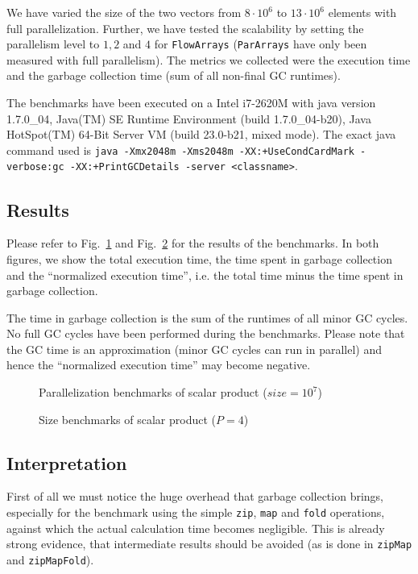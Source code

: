 \documentclass[runningheads,a4paper,fleqn]{llncs}
\begin{document}
We have varied the size of the two vectors from $8 \cdot 10^6$ to $13
\cdot 10^6$ elements with full parallelization. Further, we have
tested the scalability by setting the parallelism level to $1,2$ and
$4$ for \texttt{FlowArrays} (\texttt{ParArrays} have only been measured with full
parallelism). The metrics we collected were the execution time and the
garbage collection time (sum of all non-final GC runtimes).

The benchmarks have been executed on a Intel i7-2620M with java
version 1.7.0\_04, Java(TM) SE Runtime Environment (build
1.7.0\_04-b20), Java HotSpot(TM) 64-Bit Server VM (build 23.0-b21,
mixed mode). The exact java command used is \texttt{java -Xmx2048m
  -Xms2048m -XX:+UseCondCardMark -verbose:gc -XX:+PrintGCDetails
  -server <classname>}.

\subsection{Results}

Please refer to Fig.~\ref{fig:par-bench} and Fig.~\ref{fig:size-bench}
for the 
results of the benchmarks. In both figures, we show the total
execution time, the time spent in garbage collection and the
``normalized execution time'', i.e. the total time minus the time
spent in garbage collection.

The time in garbage collection is the sum of the runtimes of all minor
GC cycles. No full GC cycles have been performed during the
benchmarks. Please note that the GC time is an approximation (minor GC
cycles can run in parallel) and hence the ``normalized execution
time'' may become negative.

\begin{figure}
\caption{Parallelization benchmarks of scalar product ($size = 10^7$)}
\label{fig:par-bench}
\end{figure}

\begin{figure}
\caption{Size benchmarks of scalar product ($P = 4$)}
\label{fig:size-bench}
\end{figure}

\subsection{Interpretation}
First of all we must notice the huge overhead that garbage collection
brings, especially for the benchmark using the simple \texttt{zip},
\texttt{map} and \texttt{fold} operations, against which the actual
calculation time becomes negligible. This 
is already strong evidence, that intermediate results should be
avoided (as is done in \texttt{zipMap} and \texttt{zipMapFold}).
\end{document}
